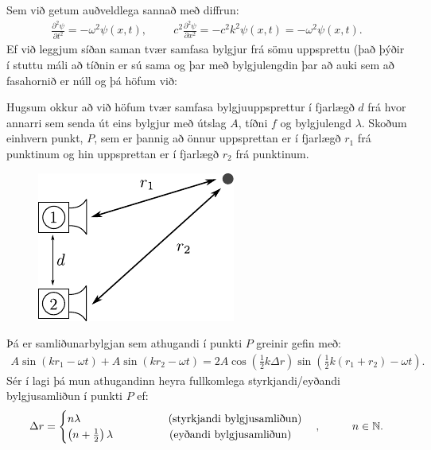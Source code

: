 Sem við getum auðveldlega sannað með diffrun:
\begin{align*}
    \frac{\partial^2\psi}{\partial t^2} = -\omega^2 \psi(x,t), \hspace{1cm} c^2\frac{\partial^2 \psi}{\partial x^2} = -c^2k^2\psi(x,t) = -\omega^2 \psi(x,t).
\end{align*}
Ef við leggjum síðan saman tvær samfasa bylgjur frá sömu uppsprettu (það þýðir í stuttu máli að tíðnin er sú sama og þar með bylgjulengdin þar að auki sem að fasahornið er núll og  þá höfum við:

\begin{tcolorbox}
\begin{theorem}
Hugsum okkur að við höfum tvær samfasa bylgjuuppsprettur í fjarlægð $d$ frá hvor annarri sem senda út eins bylgjur með útslag $A$, tíðni $f$ og bylgjulengd $\lambda$. Skoðum einhvern punkt, $P$, sem er þannig að önnur uppsprettan er í fjarlægð $r_1$ frá punktinum og hin uppsprettan er í fjarlægð $r_2$ frá punktinum.
\begin{figure}[H]
    \centering
    \vspace{-0.5cm}
    \includegraphics{figures/hatalari-dist.pdf}
\end{figure}
Þá er samliðunarbylgjan sem athugandi í punkti $P$ greinir gefin með:
\begin{align*} 
A\sin(kr_1-\omega t) + A\sin(kr_2 - \omega t) = 2A\cos(\frac{1}{2}k\Delta r)\sin(\frac{1}{2}k(r_1+r_2)-\omega t).
\end{align*}
Sér í lagi þá mun athugandinn heyra fullkomlega styrkjandi/eyðandi bylgjusamliðun í punkti $P$ ef:
\begin{align*}
    \Delta r = \begin{cases}
    n \lambda \hspace{2.8cm} \text{(styrkjandi bylgjusamliðun)} \\
    \left(n+\frac{1}{2}\right)\lambda \hspace{1.8cm} \text{(eyðandi bylgjusamliðun)}
    \end{cases},\hspace{1cm} n \in \mathbb{N}.
\end{align*}
\end{theorem}
\end{tcolorbox}

